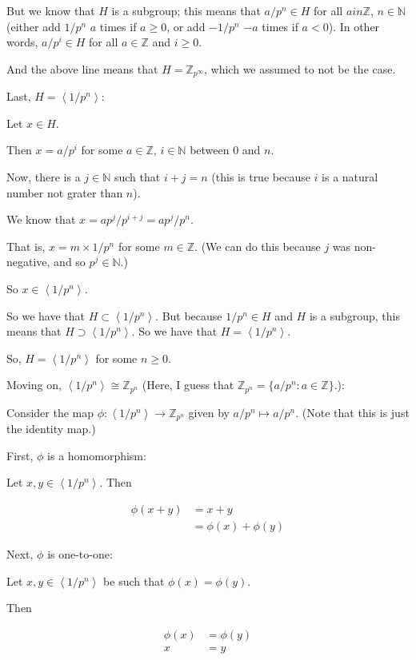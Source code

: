 \documentclass[a4paper,12pt]{article}
\newcommand{\tab}{\hspace{4mm}} %
\newcommand{\anbrack}[1]{\left\langle #1 \right\rangle}
\newcommand{\N}{\mathbb{N}}
\newcommand{\Z}{\mathbb{Z}}
\begin{document}
\tab But we know that $H$ is a subgroup; this means that $a/p^n \in H$ for all $a in \Z$, $n \in \N$ (either add $1/p^n$ $a$ times if $a \geq 0$, or add $-1/p^n$ $-a$ times if $a < 0$). In other words, $a/p^i \in H$ for all $a \in \Z$ and $i \geq 0$.

\tab And the above line means that $H = \Z_{p^\infty}$, which we assumed to not be the case.

Last, $H = \anbrack{1/p^n}$:

\tab Let $x \in H$.

\tab Then $x = a/p^i$ for some $a \in \Z$, $i \in \N$ between $0$ and $n$.

\tab Now, there is a $j \in \N$ such that $i+j = n$ (this is true because $i$ is a natural number not grater than $n$).

\tab We know that $x=ap^j/p^{i+j} = ap^j/p^n$. 

\tab That is, $x= m \times 1/p^n$ for some $m \in \Z$. (We can do this because $j$ was non-negative, and so $p^j \in \N$.)

\tab So $x \in \anbrack{1/p^n}$.

\tab So we have that $H \subset \anbrack{1/p^n}$. But because $1/p^n \in H$ and $H$ is a subgroup, this means that $H \supset \anbrack{1/p^n}$. So we have that $H = \anbrack{1/p^n}$.

So, $H = \anbrack{1/p^n}$ for some $n \geq 0$.

Moving on, $\anbrack{1/p^n} \cong \Z_{p^n}$ (Here, I guess that $\Z_{p^n} = \{a/p^n: a \in \Z\}$.):

\tab Consider the map $\phi: \anbrack{1/p^n} \to \Z_{p^n}$ given by $a/p^n \mapsto a/p^n$. (Note that this is just the identity map.)

First, $\phi$ is a homomorphism:

\tab Let $x,y \in \anbrack{1/p^n}$. Then

\begin{align*}
\phi(x+y) &= x+y\\
&=\phi(x)+\phi(y)
\end{align*}

Next, $\phi$ is one-to-one:

\tab Let $x,y \in \anbrack{1/p^n}$ be such that $\phi(x)=\phi(y)$.

\tab Then

\begin{align*}
\phi(x) &=\phi(y)\\
x&=y
\end{align*}
\end{document}
